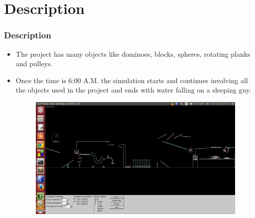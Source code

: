 \documentclass{beamer}
\begin{document}


\section{Description}



\begin{frame}
\frametitle{Description}
\begin{itemize}
\item The project has many objects like dominoes, blocks, spheres, rotating planks and pulleys.
\item Once the time is 6:00 A.M. the simulation starts and continues involving all the objects used in the project and ends with water falling on a sleeping guy.
\begin{figure}
\includegraphics[width=0.8\linewidth]{screen.png}
\end{figure}
\end{itemize}
\end{frame}
\end{document}
